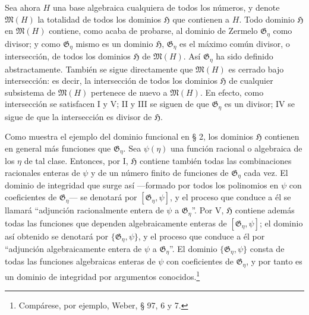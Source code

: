\documentclass[11pt]{article}
\begin{document}
Sea ahora $H$ una base algebraica cualquiera de todos los números, y denote $\mathfrak M(H)$ la totalidad de todos los dominios $\mathfrak H$ que contienen a $H$. Todo dominio $\mathfrak H$ en $\mathfrak M(H)$ contiene, como acaba de probarse, al dominio de Zermelo $\mathfrak G_\eta$ como divisor; y como $\mathfrak G_\eta$ mismo es un dominio $\mathfrak H$, $\mathfrak G_\eta$ es el máximo común divisor, o intersección, de todos los dominios $\mathfrak H$ de $\mathfrak M(H)$. Así $\mathfrak G_\eta$ ha sido definido abstractamente. También se sigue directamente que $\mathfrak M(H)$ es cerrado bajo intersección: es decir, la intersección de todos los dominios $\mathfrak H$ de cualquier subsistema de $\mathfrak M(H)$ pertenece de nuevo a $\mathfrak M(H)$. En efecto, como intersección se satisfacen I y V; II y III se siguen de que $\mathfrak G_\eta$ es un divisor; IV se sigue de que la intersección es divisor de $\mathfrak H$.

Como muestra el ejemplo del dominio funcional en § 2, los dominios $\mathfrak H$ contienen en general más funciones que $\mathfrak G_\eta$. Sea $\psi(\eta)$ una función racional o algebraica de los $\eta$ de tal clase. Entonces, por I, $\mathfrak H$ contiene también todas las combinaciones racionales enteras de $\psi$ y de un número finito de funciones de $\mathfrak G_\eta$ cada vez. El dominio de integridad que surge así ---formado por todos los polinomios en $\psi$ con coeficientes de $\mathfrak G_\eta$--- se denotará por $[\mathfrak G_\eta,\psi]$, y el proceso que conduce a él se llamará ``adjunción racionalmente entera de $\psi$ a $\mathfrak G_\eta$''. Por V, $\mathfrak H$ contiene además todas las funciones que dependen algebraicamente enteras de $[\mathfrak G_\eta,\psi]$; el dominio así obtenido se denotará por $\{\mathfrak G_\eta,\psi\}$, y el proceso que conduce a él por ``adjunción algebraicamente entera de $\psi$ a $\mathfrak G_\eta$''. El dominio $\{\mathfrak G_\eta,\psi\}$ consta de todas las funciones algebraicas enteras de $\psi$ con coeficientes de $\mathfrak G_\eta$, y por tanto es un dominio de integridad por argumentos conocidos.\footnote{Compárese, por ejemplo, Weber, § 97, 6 y 7.}
\end{document}
